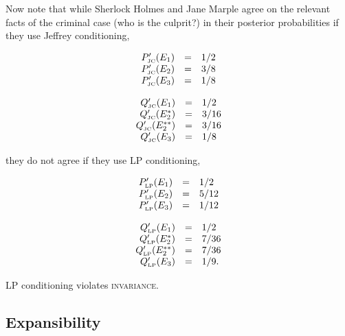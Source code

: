 \documentclass[12pt]{article}
\begin{document}
Now note that while Sherlock Holmes and Jane Marple agree on the
relevant facts of the criminal case (who is the culprit?) in their
posterior probabilities if they use Jeffrey conditioning,

\begin{equation}
  \label{eq:sherlockposteriorjc}
  \begin{array}{rcl}
  P'_{\mbox{\tiny JC}}(E_{1})&=&1/2\\
  P'_{\mbox{\tiny JC}}(E_{2})&=&3/8\\
  P'_{\mbox{\tiny JC}}(E_{3})&=&1/8
\end{array}
\end{equation}

\begin{equation}
  \label{eq:marpleposteriorjc}
  \begin{array}{rcl}
  Q'_{\mbox{\tiny JC}}(E_{1})&=&1/2\\
  Q'_{\mbox{\tiny JC}}(E_{2}^{*})&=&3/16\\
  Q'_{\mbox{\tiny JC}}(E_{2}^{**})&=&3/16\\
  Q'_{\mbox{\tiny JC}}(E_{3})&=&1/8
\end{array}
\end{equation}

they do not agree if they use LP conditioning,

\begin{equation}
  \label{eq:sherlockposteriorlp}
  \begin{array}{rcl}
  P'_{\mbox{\tiny LP}}(E_{1})&=&1/2\\
  P'_{\mbox{\tiny LP}}(E_{2})&=&5/12\\
  P'_{\mbox{\tiny LP}}(E_{3})&=&1/12
\end{array}
\end{equation}

\begin{equation}
  \label{eq:marpleposteriorlp}
  \begin{array}{rcl}
  Q'_{\mbox{\tiny LP}}(E_{1})&=&1/2\\
  Q'_{\mbox{\tiny LP}}(E_{2}^{*})&=&7/36\\
  Q'_{\mbox{\tiny LP}}(E_{2}^{**})&=&7/36\\
  Q'_{\mbox{\tiny LP}}(E_{3})&=&1/9.
\end{array}
\end{equation}

LP conditioning violates \textsc{invariance}.

\subsection{Expansibility}
\label{Expansibility}
\end{document}

